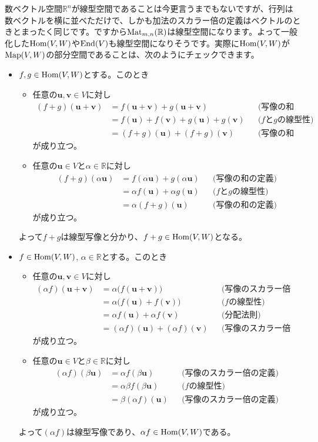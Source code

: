 数ベクトル空間$\mathbb{R}^n$が線型空間であることは今更言うまでもないですが、行列は数ベクトルを横に並べただけで、しかも加法のスカラー倍の定義はベクトルのときとまったく同じです。ですから$\operatorname{Mat}_{m, n}(\mathbb{R})$は線型空間になります。よって一般化した$\operatorname{Hom}(V, W)$や$\operatorname{End}(V)$も線型空間になりそうです。実際に$\operatorname{Hom}(V, W)$が$\operatorname{Map}(V, W)$の部分空間であることは、次のようにチェックできます。
\begin{itemize}
\item $f, g\in \operatorname{Hom}(V, W)$とする。このとき
\begin{itemize}
\item 任意の$\bm{u}, \bm{v}\in V$に対し
\begin{align*}
(f + g)(\bm{u} + \bm{v})
&= f(\bm{u} + \bm{v}) + g(\bm{u} + \bm{v}) & & \text{(写像の和の定義)} \\
&= f(\bm{u}) + f(\bm{v}) + g(\bm{u}) + g(\bm{v}) & & \text{($f$と$g$の線型性)} \\
&= (f + g)(\bm{u}) + (f + g)(\bm{v}) & & \text{(写像の和の定義)}
\end{align*}
が成り立つ。
\item 任意の$\bm{u} \in V$と$\alpha \in \mathbb{R}$に対し
\begin{align*}
(f + g)(\alpha \bm{u})
&= f(\alpha \bm{u}) + g(\alpha \bm{u}) & & \text{(写像の和の定義)} \\
&= \alpha f(\bm{u}) + \alpha g(\bm{u}) & & \text{($f$と$g$の線型性)} \\
&= \alpha(f + g)(\bm{u}) & & \text{(写像の和の定義)}
\end{align*}
が成り立つ。
\end{itemize}
よって$f + g$は線型写像と分かり、$f+g \in \operatorname{Hom}(V, W)$となる。
\item $f\in \operatorname{Hom}(V, W)$, $\alpha \in \mathbb{R}$とする。このとき
\begin{itemize}
\item 任意の$\bm{u}, \bm{v}\in V$に対し
\begin{align*}
(\alpha f)(\bm{u} + \bm{v})
&= \alpha\bigl(f(\bm{u} + \bm{v})\bigr) & & \text{(写像のスカラー倍の定義)} \\
&= \alpha\bigl(f(\bm{u}) + f(\bm{v})\bigr) & & \text{($f$の線型性)} \\
&= \alpha f(\bm{u}) + \alpha f(\bm{v}) & & \text{(分配法則)} \\
&= (\alpha f)(\bm{u}) + (\alpha f)(\bm{v}) & & \text{(写像のスカラー倍の定義)}
\end{align*}
が成り立つ。
\item 任意の$\bm{u} \in V$と$\beta \in \mathbb{R}$に対し
\begin{align*}
(\alpha f)(\beta\bm{u})
&= \alpha f(\beta\bm{u}) & & \text{(写像のスカラー倍の定義)} \\
&= \alpha \beta f(\beta \bm{u}) & & \text{($f$の線型性)} \\
&= \beta(\alpha f)(\bm{u}) & & \text{(写像のスカラー倍の定義)}
\end{align*}
が成り立つ。
\end{itemize}
よって$(\alpha f)$は線型写像であり、$\alpha f\in \operatorname{Hom}(V, W)$である。
\end{itemize}


